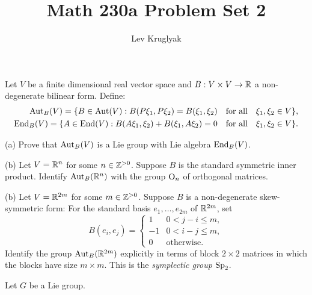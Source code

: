 \documentclass{../../templates/lkx_pset}
\title{Math 230a Problem Set 2}
\author{Lev Kruglyak}
\begin{document}
\maketitle

\begin{problem}{1}
Let $V$ be a finite dimensional real vector space and $B : V\times V \to \mathbb{R}$ a non-degenerate bilinear form. Define:
\[
	\begin{aligned}
		\textrm{Aut}_B(V) = \{ B\in \textrm{Aut}(V) : B(P\xi_1, P\xi_2)= B(\xi_1, \xi_2) \quad\textrm{for all}\quad \xi_1, \xi_2\in V\}, \\
		\textrm{End}_B(V) = \{ A\in \textrm{End}(V) : B(A\xi_1, \xi_2)+ B(\xi_1, A\xi_2)=0 \quad\textrm{for all}\quad \xi_1, \xi_2\in V\}.
	\end{aligned}
\]
\end{problem}
\begin{parts}
	\begin{part}{(a)}
		Prove that $\textrm{Aut}_B(V)$ is a Lie group with Lie algebra $\textrm{End}_B(V)$.
	\end{part}

	\begin{part}{(b)}
		Let $V= \mathbb{R}^n$ for some $n\in \mathbb{Z}^{>0}$. Suppose $B$ is the standard symmetric inner product. Identify $\textrm{Aut}_B(\mathbb{R}^n)$ with the group $\operatorname{O}_n$ of orthogonal matrices.
	\end{part}

	\begin{part}{(b)}
		Let $V= \mathbb{R}^{2m}$ for some $m\in \mathbb{Z}^{>0}$. Suppose $B$ is a non-degenerate skew-symmetric form: For the standard basis $e_1,\ldots, e_{2m}$ of $\mathbb{R}^{2m}$, set
		\[
			B(e_i, e_j) = \begin{cases} 1 & 0<j-i\leq m,\\ -1& 0<i-j\leq m,\\ 0&\textrm{otherwise}.\end{cases}
		\]
		Identify the group $\textrm{Aut}_{B}(\mathbb{R}^{2m})$ explicitly in terms of block $2\times 2$ matrices in which the blocks have size $m\times m$. This is the \emph{symplectic group} $\operatorname{Sp}_2$.
	\end{part}

\end{parts}

\begin{problem}{2}
\end{problem}

\begin{problem}{5}
Let $G$ be a Lie group.
\end{problem}
\end{document}
